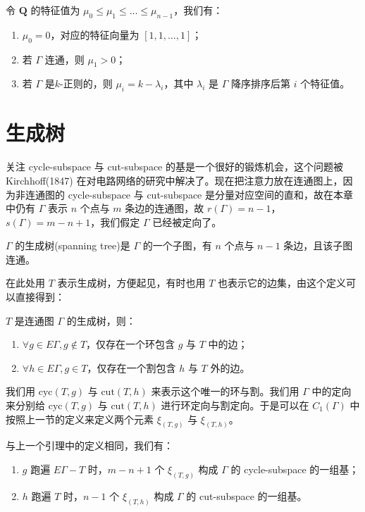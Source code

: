 \begin{proposition}[Laplacian谱]
令 $\textbf{Q}$ 的特征值为 $\mu_0 \le \mu_1 \le \dots \le \mu_{n - 1}$，我们有：
\begin{enumerate}
    \item $\mu_0 = 0$，对应的特征向量为 $[1, 1, \dots, 1]$；
    \item 若 $\Gamma$ 连通，则 $\mu_1 > 0$；
    \item 若 $\Gamma$ 是$k$-正则的，则 $\mu_i = k - \lambda_i$，其中 $\lambda_i$ 是 $\Gamma$ 降序排序后第 $i$ 个特征值。
\end{enumerate}
\end{proposition}



\section{生成树}

关注 cycle-subspace 与 cut-subspace 的基是一个很好的锻炼机会，这个问题被 Kirchhoff(1847) 在对电路网络的研究中解决了。现在把注意力放在连通图上，因为非连通图的 cycle-subspace 与 cut-subspace 是分量对应空间的直和，故在本章中仍有 $\Gamma$ 表示 $n$ 个点与 $m$ 条边的连通图，故 $r(\Gamma) = n - 1$，$s(\Gamma) = m - n + 1$，我们假定 $\Gamma$ 已经被定向了。

\begin{definition}[生成树]
$\Gamma$ 的生成树(spanning tree)是 $\Gamma$ 的一个子图，有 $n$ 个点与 $n - 1$ 条边，且该子图连通。
\end{definition}

在此处用 $T$ 表示生成树，方便起见，有时也用 $T$ 也表示它的边集，由这个定义可以直接得到：

\begin{lemma}
$T$ 是连通图 $\Gamma$ 的生成树，则：
\begin{enumerate}
    \item $\forall g\in E\Gamma, g \notin T$，仅存在一个环包含 $g$ 与 $T$ 中的边；
    \item $\forall h\in E\Gamma, g \in T$，仅存在一个割包含 $h$ 与 $T$ 外的边。
\end{enumerate}
\end{lemma}

我们用 $\text{cyc}(T,g)$ 与 $\text{cut}(T,h)$ 来表示这个唯一的环与割。我们用 $\Gamma$ 中的定向来分别给 $\text{cyc}(T,g)$ 与 $\text{cut}(T,h)$ 进行环定向与割定向。于是可以在 $C_1(\Gamma)$ 中按照上一节的定义来定义两个元素 $\xi_{(T,g)}$ 与 $\xi_{(T,h)}$。

\begin{theorem}
与上一个引理中的定义相同，我们有：
\begin{enumerate}
    \item $g$ 跑遍 $E\Gamma - T$ 时，$m - n + 1$ 个 $\xi_{(T,g)}$ 构成 $\Gamma$ 的 cycle-subspace 的一组基；
    \item $h$ 跑遍 $T$ 时，$n - 1$ 个 $\xi_{(T,h)}$ 构成 $\Gamma$ 的 cut-subspace 的一组基。
\end{enumerate}
\end{theorem}






















